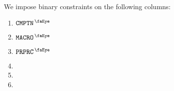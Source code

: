 We impose binary constraints on the following columns:
\begin{multicols}{2}
	\begin{enumerate}
		\item $\isComputation$
		\item $\isMacro$
		\item $\isPreprocessing$
		\item \isExpLog{}
		\item \isModexpLog{}
		\item[\vspace{\fill}]
	\end{enumerate}
\end{multicols}
